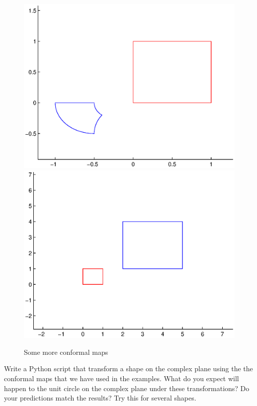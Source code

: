 \begin{figure}
\begin{center}
\includegraphics[scale=0.33]{map3}
\includegraphics[scale=0.33]{map4}
\caption{Some more conformal maps}
\end{center}
\end{figure}

\begin{problem}
Write a Python script that transform a shape on the complex plane using the the conformal maps that we have used in the examples.  What do you expect will happen to the unit circle on the complex plane under these transformations?  Do your predictions match the results?  Try this for several shapes.
\end{problem}

